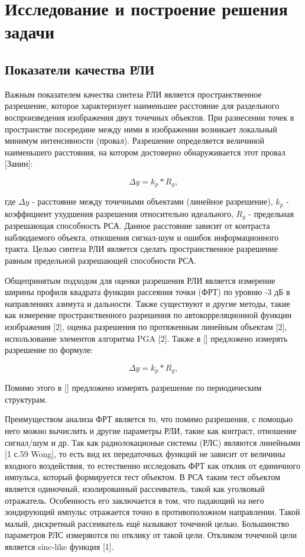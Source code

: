 \chapter{Исследование и построение решения задачи}
\label{sec:Chapter3} 


\section{Показатели качества РЛИ}

	Важным показателем качества синтеза РЛИ является пространственное разрешение, которое характеризует наименьшее расстояние для раздельного воспроизведения изображения двух точечных объектов. При разнесении точек в пространстве посередине между ними в изображении возникает локальный минимум интенсивности (провал). Разрешение определяется величиной наименьшего расстояния, на котором достоверно обнаруживается этот провал [Занин]:
	
\begin{equation}
    \Delta y = k_p*R_g,
\end{equation}

где $ \Delta y $ - расстояние между точечными объектами (линейное разрешение), $ k_p $ - коэффициент ухудшения разрешения относительно идеального, $ R_g $ - предельная разрешающая способность РСА. 
	Данное расстояние зависит от контраста наблюдаемого объекта, отношения сигнал-шум и ошибок информационного тракта. Целью синтеза РЛИ является сделать пространственное разрешение равным предельной разрешающей способности РСА.
	
	Общепринятым подходом для оценки разрешения РЛИ является измерение ширины профиля квадрата функции рассеяния точки (ФРТ) по уровню -3 дБ в направлениях азимута и дальности. Также существуют и другие методы, такие как измерение пространственного разрешения по автокорреляционной функции  изображения [2], оценка разрешения по протяженным линейным объектам [2], использование элементов алгоритма PGA [2]. Также в [] предложено измерять разрешение по формуле:
	
\begin{equation}
    \Delta y = k_p*R_g,
\end{equation}
	
	Помимо этого в [] предложено измерять разрешение по периодическим структурам.	
	
	Преимуществом анализа ФРТ является то, что помимо разрешения, с помощью него можно вычислить и другие параметры РЛИ, такие как контраст, отношение сигнал/шум и др. Так как радиолокационые системы (РЛС) являются линейными [1 с.59 Wong], то есть вид их передаточных функций не зависит от величины входного воздействия, то естественно исследовать ФРТ как отклик от единичного импульса, который формируется тест объектом. В РСА таким тест объектом является одиночный, изолированный рассеиватель, такой как уголковый отражатель. Особенность его заключается в том, что падающий на него зондирующий импульс отражается точно в противоположном направлении. Такой малый, дискретный рассеиватель ещё называют точечной целью. Большинство параметров РЛС измеряются по отклику от такой цели. Откликом точечной цели является sinc-like функция [1].

